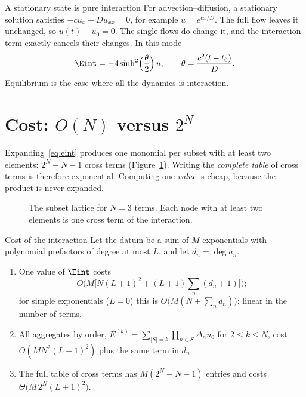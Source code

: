 \begin{example}{A stationary state is pure interaction}
For advection--diffusion, a stationary solution satisfies $-cu_x+Du_{xx}=0$, for example $u=e^{cx/D}$. The full flow leaves it unchanged, so $u(t)-u_0=0$. The single flows do change it, and the interaction term exactly cancels their changes. In this mode
\[
\Eint=-4\sinh^2\!\Big(\frac{\theta}{2}\Big)\,u,\qquad \theta=\frac{c^2(t-t_0)}{D}.
\]
Equilibrium is the case where all the dynamics is interaction.
\end{example}

\section{Cost: $O(N)$ versus $2^N$}

Expanding~\eqref{eq:eint} produces one monomial per subset with at least two elements: $2^N-N-1$ cross terms (Figure~\ref{fig:lattice}). Writing the \emph{complete table} of cross terms is therefore exponential. Computing one \emph{value} is cheap, because the product is never expanded.

\begin{figure}[!htb]
\centering
{}
\caption{The subset lattice for $N=3$ terms. Each node with at least two elements is one cross term of the interaction.}\label{fig:lattice}
\end{figure}

\begin{theorem}{Cost of the interaction  \proved}\label{thm:cost}
Let the datum be a sum of $M$ exponentials with polynomial prefactors of degree at most $L$, and let $d_n=\deg a_n$.
\begin{enumerate}[label=(\alph*)]
\item One value of $\Eint$ costs
\[
O\Big(M\big[N(L+1)^2+(L+1)\textstyle\sum_n(d_n+1)\big]\Big);
\]
for simple exponentials ($L=0$) this is $O\big(M(N+\sum_nd_n)\big)$: linear in the number of terms.
\item All aggregates by order, $E^{(k)}=\sum_{|S|=k}\prod_{n\in S}\Delta_nu_0$ for $2\le k\le N$, cost $O(MN^2(L+1)^2)$ plus the same term in $d_n$.
\item The full table of cross terms has $M(2^N-N-1)$ entries and costs $\Theta\big(M\,2^N(L+1)^2\big)$.
\end{enumerate}
\end{theorem}

